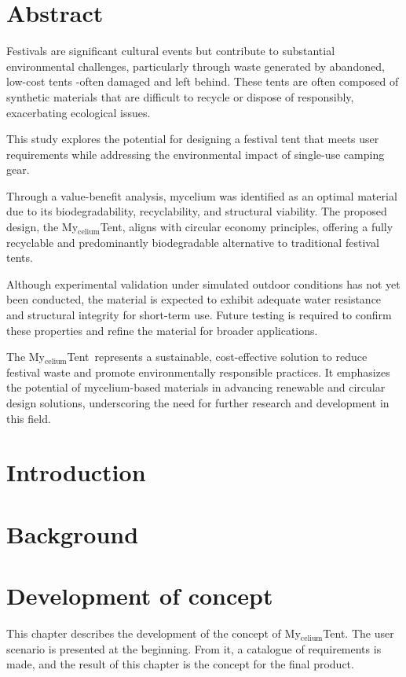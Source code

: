 \documentclass{article}
\newcommand{\myc}{My$_{\text{celium}}$Tent}
\begin{document}
\tableofcontents
\thispagestyle{empty}

\newpage
\section{Abstract}
Festivals are significant cultural events but contribute to
substantial environmental challenges, particularly through waste
generated by abandoned, low-cost tents -often damaged and left behind.
These tents are often composed of synthetic materials that are
difficult to recycle or dispose of responsibly, exacerbating
ecological issues. 

This study explores the potential for designing a festival tent that
meets user requirements while addressing the environmental impact of
single-use camping gear.  

Through a value-benefit analysis, mycelium was identified as an
optimal material due to its biodegradability, recyclability, and
structural viability. The proposed design, the \myc,
aligns with circular economy principles, offering a fully recyclable
and predominantly biodegradable alternative to traditional festival
tents. 

Although experimental validation under simulated outdoor conditions
has not yet been conducted, the material is expected to exhibit
adequate water resistance and structural integrity for short-term use.
Future testing is required to confirm these properties and refine the
material for broader applications. 

The \myc\ represents a sustainable, cost-effective solution to
reduce festival waste and promote environmentally responsible
practices. It emphasizes the potential of mycelium-based materials in
advancing renewable and circular design solutions, underscoring the
need for further research and development in this field. 

\section{Introduction}


\newpage
\section{Background}

\newpage
\section{Development of concept}
This chapter describes the development of the concept of \myc.
The user scenario is presented at the beginning. From it, a catalogue
of requirements is made, and the result of this chapter is the
concept for the final product.
\end{document}
